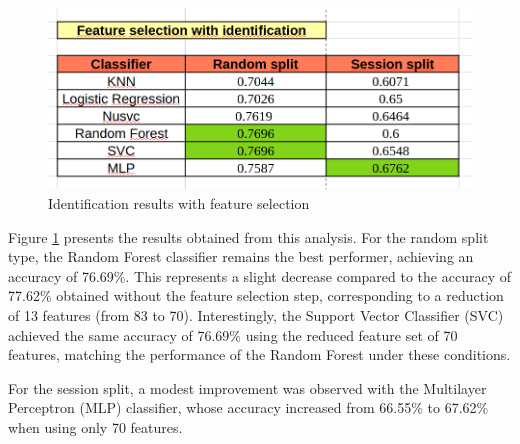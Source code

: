 \documentclass{article}
\begin{document}
\begin{figure}[ht]
    \centering
    \includegraphics[width = 0.6
    \textwidth]{Images/Results/Identification/fs.png}
    \caption{Identification results with feature selection}
    \label{fig:id_fs}
\end{figure}

Figure \ref{fig:id_fs} presents the results obtained from this analysis.
For the random split type, the Random Forest classifier remains the best performer, achieving an accuracy of 76.69\%.
This represents a slight decrease compared to the accuracy of 77.62\% obtained without the feature selection step, corresponding to a reduction of 13 features (from 83 to 70).
Interestingly, the Support Vector Classifier (SVC) achieved the same accuracy of 76.69\% using the reduced feature set of 70 features, matching the performance of the Random Forest under these conditions.

For the session split, a modest improvement was observed with the Multilayer Perceptron (MLP) classifier, whose accuracy increased from 66.55\% to 67.62\% when using only 70 features.
\end{document}
